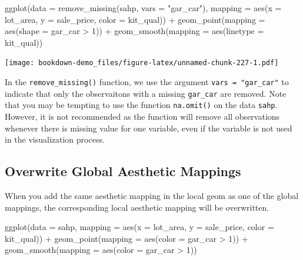\documentclass[
]{book}
\newenvironment{Shaded}{\begin{snugshade}}{\end{snugshade}}
\newcommand{\AttributeTok}[1]{\textcolor[rgb]{0.77,0.63,0.00}{#1}}
\newcommand{\DecValTok}[1]{\textcolor[rgb]{0.00,0.00,0.81}{#1}}
\newcommand{\FunctionTok}[1]{\textcolor[rgb]{0.00,0.00,0.00}{#1}}
\newcommand{\NormalTok}[1]{#1}
\newcommand{\SpecialCharTok}[1]{\textcolor[rgb]{0.00,0.00,0.00}{#1}}
\newcommand{\StringTok}[1]{\textcolor[rgb]{0.31,0.60,0.02}{#1}}
\begin{document}
\begin{Shaded}
\begin{Highlighting}[]
\FunctionTok{ggplot}\NormalTok{(}\AttributeTok{data =} \FunctionTok{remove\_missing}\NormalTok{(sahp, }\AttributeTok{vars =} \StringTok{"gar\_car"}\NormalTok{), }\AttributeTok{mapping =} \FunctionTok{aes}\NormalTok{(}\AttributeTok{x =}\NormalTok{ lot\_area, }\AttributeTok{y =}\NormalTok{ sale\_price, }\AttributeTok{color =}\NormalTok{ kit\_qual)) }\SpecialCharTok{+} \FunctionTok{geom\_point}\NormalTok{(}\AttributeTok{mapping =} \FunctionTok{aes}\NormalTok{(}\AttributeTok{shape =}\NormalTok{ gar\_car }\SpecialCharTok{\textgreater{}} \DecValTok{1}\NormalTok{)) }\SpecialCharTok{+} \FunctionTok{geom\_smooth}\NormalTok{(}\AttributeTok{mapping =} \FunctionTok{aes}\NormalTok{(}\AttributeTok{linetype =}\NormalTok{ kit\_qual))}
\end{Highlighting}
\end{Shaded}

\texttt{[image: bookdown-demo\_files/figure-latex/unnamed-chunk-227-1.pdf]}

In the \texttt{remove\_missing()} function, we use the argument \texttt{vars\ =\ "gar\_car"} to indicate that only the observaitons with a missing \texttt{gar\_car} are removed. Note that you may be tempting to use the function \texttt{na.omit()} on the data \texttt{sahp}. However, it is not recommended as the function will remove all observations whenever there is missing value for one variable, even if the variable is not used in the visualization process.

\hypertarget{overwrite-global-aesthetic-mappings}{%
\subsection{Overwrite Global Aesthetic Mappings}\label{overwrite-global-aesthetic-mappings}}

When you add the same aesthetic mapping in the local geom as one of the global mappings, the corresponding local aesthetic mapping will be overwritten.

\begin{Shaded}
\begin{Highlighting}[]
\FunctionTok{ggplot}\NormalTok{(}\AttributeTok{data =}\NormalTok{ sahp, }\AttributeTok{mapping =} \FunctionTok{aes}\NormalTok{(}\AttributeTok{x =}\NormalTok{ lot\_area, }\AttributeTok{y =}\NormalTok{ sale\_price, }\AttributeTok{color =}\NormalTok{ kit\_qual)) }\SpecialCharTok{+} \FunctionTok{geom\_point}\NormalTok{(}\AttributeTok{mapping =} \FunctionTok{aes}\NormalTok{(}\AttributeTok{color =}\NormalTok{ gar\_car }\SpecialCharTok{\textgreater{}} \DecValTok{1}\NormalTok{)) }\SpecialCharTok{+} \FunctionTok{geom\_smooth}\NormalTok{(}\AttributeTok{mapping =} \FunctionTok{aes}\NormalTok{(}\AttributeTok{color =}\NormalTok{ gar\_car }\SpecialCharTok{\textgreater{}} \DecValTok{1}\NormalTok{))}
\end{Highlighting}
\end{Shaded}
\end{document}
